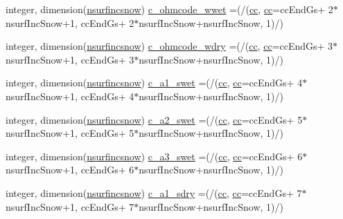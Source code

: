 \begin{DoxyCompactItemize}
\item 
integer, dimension(\hyperlink{namespaceallocatearray_af4d113f332b6759cfa22271140c9162d}{nsurfincsnow}) \hyperlink{namespaceallocatearray_a1333996a9ed29e913c8a79212a5aa7df}{c\+\_\+ohmcode\+\_\+wwet} =(/(\hyperlink{namespaceallocatearray_ac863c81704eb507dee10f5e10741e10c}{cc}, \hyperlink{namespaceallocatearray_ac863c81704eb507dee10f5e10741e10c}{cc}=cc\+End\+Gs+ 2$\ast$nsurf\+Inc\+Snow+1, cc\+End\+Gs+ 2$\ast$nsurf\+Inc\+Snow+nsurf\+Inc\+Snow, 1)/)
\item 
integer, dimension(\hyperlink{namespaceallocatearray_af4d113f332b6759cfa22271140c9162d}{nsurfincsnow}) \hyperlink{namespaceallocatearray_a7021ab6b2b0a892263e2bea80216dd42}{c\+\_\+ohmcode\+\_\+wdry} =(/(\hyperlink{namespaceallocatearray_ac863c81704eb507dee10f5e10741e10c}{cc}, \hyperlink{namespaceallocatearray_ac863c81704eb507dee10f5e10741e10c}{cc}=cc\+End\+Gs+ 3$\ast$nsurf\+Inc\+Snow+1, cc\+End\+Gs+ 3$\ast$nsurf\+Inc\+Snow+nsurf\+Inc\+Snow, 1)/)
\item 
integer, dimension(\hyperlink{namespaceallocatearray_af4d113f332b6759cfa22271140c9162d}{nsurfincsnow}) \hyperlink{namespaceallocatearray_a2af0ac8edfec0bc48cfe96430b85f9af}{c\+\_\+a1\+\_\+swet} =(/(\hyperlink{namespaceallocatearray_ac863c81704eb507dee10f5e10741e10c}{cc}, \hyperlink{namespaceallocatearray_ac863c81704eb507dee10f5e10741e10c}{cc}=cc\+End\+Gs+ 4$\ast$nsurf\+Inc\+Snow+1, cc\+End\+Gs+ 4$\ast$nsurf\+Inc\+Snow+nsurf\+Inc\+Snow, 1)/)
\item 
integer, dimension(\hyperlink{namespaceallocatearray_af4d113f332b6759cfa22271140c9162d}{nsurfincsnow}) \hyperlink{namespaceallocatearray_a23f88d3f042915af31a77a23e34ac954}{c\+\_\+a2\+\_\+swet} =(/(\hyperlink{namespaceallocatearray_ac863c81704eb507dee10f5e10741e10c}{cc}, \hyperlink{namespaceallocatearray_ac863c81704eb507dee10f5e10741e10c}{cc}=cc\+End\+Gs+ 5$\ast$nsurf\+Inc\+Snow+1, cc\+End\+Gs+ 5$\ast$nsurf\+Inc\+Snow+nsurf\+Inc\+Snow, 1)/)
\item 
integer, dimension(\hyperlink{namespaceallocatearray_af4d113f332b6759cfa22271140c9162d}{nsurfincsnow}) \hyperlink{namespaceallocatearray_aa37a60646d2e216c6ef174a9d3d937e0}{c\+\_\+a3\+\_\+swet} =(/(\hyperlink{namespaceallocatearray_ac863c81704eb507dee10f5e10741e10c}{cc}, \hyperlink{namespaceallocatearray_ac863c81704eb507dee10f5e10741e10c}{cc}=cc\+End\+Gs+ 6$\ast$nsurf\+Inc\+Snow+1, cc\+End\+Gs+ 6$\ast$nsurf\+Inc\+Snow+nsurf\+Inc\+Snow, 1)/)
\item 
integer, dimension(\hyperlink{namespaceallocatearray_af4d113f332b6759cfa22271140c9162d}{nsurfincsnow}) \hyperlink{namespaceallocatearray_aeb286eaa02498b48dc4c2ecaf21d7af5}{c\+\_\+a1\+\_\+sdry} =(/(\hyperlink{namespaceallocatearray_ac863c81704eb507dee10f5e10741e10c}{cc}, \hyperlink{namespaceallocatearray_ac863c81704eb507dee10f5e10741e10c}{cc}=cc\+End\+Gs+ 7$\ast$nsurf\+Inc\+Snow+1, cc\+End\+Gs+ 7$\ast$nsurf\+Inc\+Snow+nsurf\+Inc\+Snow, 1)/)

\end{DoxyCompactItemize}
